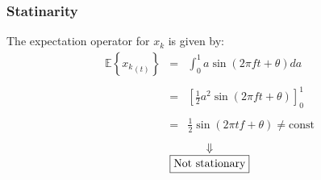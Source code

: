 \documentclass[11pt, a4paper]{article}
\begin{document}
\subsubsection{Statinarity}
The expectation operator for $x_k$ is given by:
\begin{equation}
    \begin{array}{rcl}
        \displaystyle \mathbb{E}{\left\{{x_k}_{\left(t\right)}\right\}} & = & \displaystyle \int_{0}^{1}{a\sin{\left(2\pi ft+\theta\right)}da} \\\\
        & = & \displaystyle \left[\frac{1}{2}a^2\sin{\left(2\pi ft+\theta\right)}\right]_0^1 \\\\
        & = & \displaystyle \frac{1}{2}\sin{\left(2\pi tf+\theta\right)}\ne\text{const}
    \end{array}
\end{equation}
\begin{equation*}
    \begin{array}{c}
        \Downarrow \\
        \boxed{$\text{Not stationary}$}
    \end{array}
\end{equation*}
\end{document}
